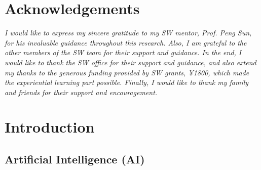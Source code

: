 \documentclass[11pt,a4paper,oneside]{report}
\newcommand{\instructions}[1]{{\color{black}\itshape #1}}
\begin{document}

\chapter*{Acknowledgements}
\label{acknowledgements}

\instructions{I would like to express my sincere gratitude to my SW mentor, Prof. Peng Sun, 
for his invaluable guidance throughout this research. 
Also, I am grateful to the other members of the SW team for their support and guidance. 
In the end, I would like to thank the SW office for their support and guidance, 
and also extend my thanks to the generous funding provided by SW grants, ¥1800, which made the experiential learning part possible. 
Finally, I would like to thank my family and friends for their support and encouragement. 
}

\newpage


\setcounter{tocdepth}{1}
\listoffigures\newpage




\clearpage
{}


\chapter{Introduction}
\label{introduction}

\section{Artificial Intelligence (AI)}
\end{document}
